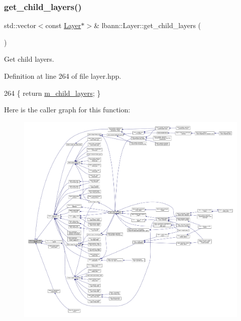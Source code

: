 \subsubsection{\texorpdfstring{get\+\_\+child\+\_\+layers()}{get\_child\_layers()}\hspace{0.1cm}{\footnotesize\ttfamily [1/2]}}
{\footnotesize\ttfamily std\+::vector$<$const \hyperlink{classlbann_1_1Layer}{Layer}$\ast$$>$\& lbann\+::\+Layer\+::get\+\_\+child\+\_\+layers (\begin{DoxyParamCaption}{ }\end{DoxyParamCaption})\hspace{0.3cm}{\ttfamily [inline]}}

Get child layers. 

Definition at line 264 of file layer.\+hpp.


\begin{DoxyCode}
264 \{ \textcolor{keywordflow}{return} \hyperlink{classlbann_1_1Layer_ae348c0d2b4d05f74d809d09debb633c0}{m\_child\_layers}; \}
\end{DoxyCode}
Here is the caller graph for this function\+:\nopagebreak
\begin{figure}[H]
\begin{center}
\leavevmode
\includegraphics[width=350pt]{classlbann_1_1Layer_aa0058c8ec4913efc3e4de5d6f61eb8db_icgraph}
\end{center}
\end{figure}
\mbox{\label{classlbann_1_1Layer_a0ad6c5253a4545a7322766d586a4bd33}} 
